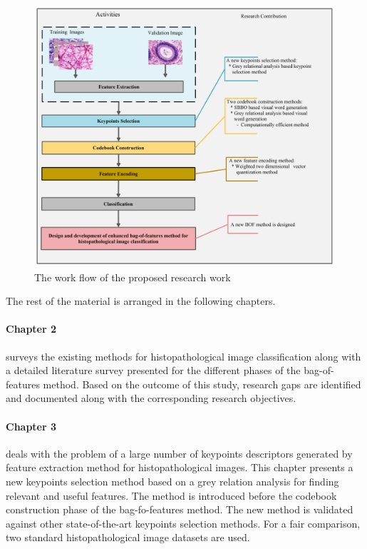 \begin{figure}[h]
\centering
     \includegraphics[width=\textwidth]{RM1}
   \caption [The work flow of the proposed research work]{\fontsize{10pt}{12pt}\selectfont The work flow of the proposed research work}
 \label{ch1:fig:The flow chart of the proposed research work}
\end{figure}
The rest of the material is arranged in the following chapters.

\paragraph{Chapter 2} surveys the existing methods for histopathological image classification along with a detailed literature survey presented for the different phases of the bag-of-features method. Based on the outcome of this study, research gaps are identified and documented along with the corresponding research objectives.

\paragraph{Chapter 3} deals with the problem of a large number of keypoints descriptors generated by feature extraction method for histopathological images. This chapter presents a new keypoints selection method based on a grey relation analysis for finding relevant and useful features. The method is introduced before the codebook construction phase of the bag-fo-features method. The new method is validated against other state-of-the-art keypoints selection methods. For a fair comparison, two standard histopathological image datasets are used. 

